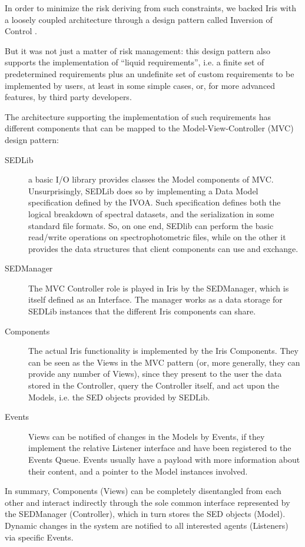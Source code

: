 \documentclass[5p]{elsarticle}
\begin{document}
In order to minimize the risk deriving from such constraints, we backed Iris with a loosely coupled architecture through a design pattern called Inversion of Control \citep*{ioc}.

But it was not just a matter of risk management: this design pattern also supports the implementation of ``liquid requirements'', i.e. a finite set of predetermined requirements plus an undefinite set of custom requirements to be implemented by users, at least in some simple cases, or, for more advanced features, by third party developers.

The architecture supporting the implementation of such requirements has different components that can be mapped to the Model-View-Controller (MVC) design pattern:
\begin{description}
\item[SEDLib] a basic I/O library provides classes the Model components of MVC. Unsurprisingly, SEDLib does so by implementing a Data Model specification defined by the IVOA. Such specification defines both the logical breakdown of spectral datasets, and the serialization in some standard file formats. So, on one end, SEDlib can perform the basic read/write operations on spectrophotometric files, while on the other it provides the data structures that client components can use and exchange.
\item[SEDManager] The MVC Controller role is played in Iris by the SEDManager, which is itself defined as an Interface. The manager works as a data storage for SEDLib instances that the different Iris components can share.
\item[Components] The actual Iris functionality is implemented by the Iris Components. They can be seen as the Views in the MVC pattern (or, more generally, they can provide any number of Views), since they present to the user the data stored in the Controller, query the Controller itself, and act upon the Models, i.e. the SED objects provided by SEDLib.
\item[Events] Views can be notified of changes in the Models by Events, if they implement the relative Listener interface and have been registered to the Events Queue. Events usually have a payload with more information about their content, and a pointer to the Model instances involved.
\end{description}

In summary, Components (Views) can be completely disentangled from each other and interact indirectly through the sole common interface represented by the SEDManager (Controller), which in turn stores the SED objects (Model). Dynamic changes in the system are notified to all interested agents (Listeners) via specific Events.
\end{document}
